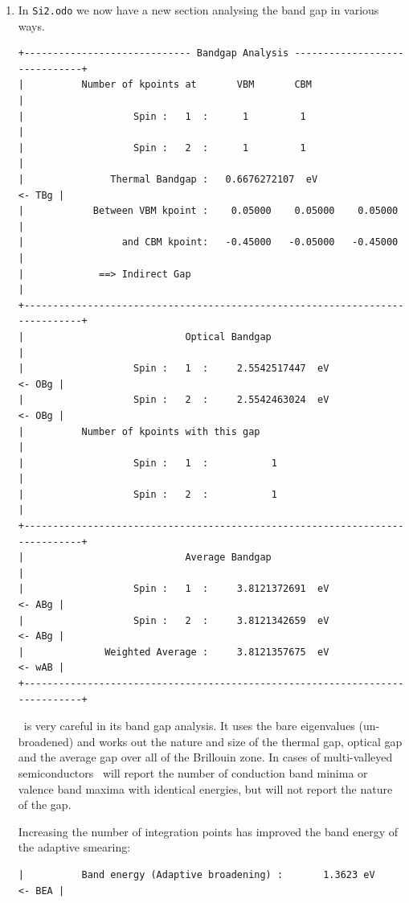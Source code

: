 \documentclass[a4paper,11pt,twoside]{book}
\begin{document}
{\begin{enumerate}
\item In  \verb#Si2.odo# we now have a new section analysing the band gap in various ways.
\begin{verbatim}
+----------------------------- Bandgap Analysis ------------------------------+
|          Number of kpoints at       VBM       CBM                           |
|                   Spin :   1  :      1         1                            |
|                   Spin :   2  :      1         1                            |
|               Thermal Bandgap :   0.6676272107  eV                   <- TBg |
|            Between VBM kpoint :    0.05000    0.05000    0.05000            |
|                 and CBM kpoint:   -0.45000   -0.05000   -0.45000            |
|             ==> Indirect Gap                                                |
+-----------------------------------------------------------------------------+
|                            Optical Bandgap                                  |
|                   Spin :   1  :     2.5542517447  eV                 <- OBg |
|                   Spin :   2  :     2.5542463024  eV                 <- OBg |
|          Number of kpoints with this gap                                    |
|                   Spin :   1  :           1                                 |
|                   Spin :   2  :           1                                 |
+-----------------------------------------------------------------------------+
|                            Average Bandgap                                  |
|                   Spin :   1  :     3.8121372691  eV                 <- ABg |
|                   Spin :   2  :     3.8121342659  eV                 <- ABg |
|              Weighted Average :     3.8121357675  eV                 <- wAB |
+-----------------------------------------------------------------------------+
\end{verbatim}

\optados\ is very careful in its band gap analysis. It uses the bare eigenvalues (un-broadened) and works out the nature and size of the thermal gap, optical gap and the average gap over all of the Brillouin zone. In cases of multi-valleyed semiconductors \optados\ will report the number of conduction band minima or valence band maxima with identical energies, but will not report the nature of the gap.

Increasing the number of integration points has improved the band energy of the adaptive smearing:
\begin{verbatim}
|          Band energy (Adaptive broadening) :       1.3623 eV         <- BEA |
\end{verbatim}



\end{enumerate}}
\end{document}
